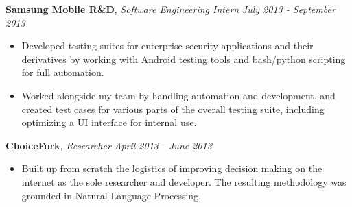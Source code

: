 \documentclass[9pt]{article}
\newenvironment{changemargin}[2]{%
  \begin{list}{}{%
    \setlength{\topsep}{0pt}%
    \setlength{\leftmargin}{#1}%
    \setlength{\rightmargin}{#2}%
    \setlength{\listparindent}{\parindent}%
    \setlength{\itemindent}{\parindent}%
    \setlength{\parsep}{\parskip}%
  }%
  \item[]}{\end{list}
}
\newenvironment{body} {
	\vspace*{-16pt}
	\begin{changemargin}{-0.25in}{-0.5in}
  }	
	{\end{changemargin}
}
\begin{document}
\begin{body}
\begin{itemize}
	\end{itemize}
	\vspace*{-2pt}
	\textbf{Samsung Mobile R\&D}, \emph{Software Engineering Intern} \hfill \emph{July 2013 - September 2013}\\
	\vspace*{-3pt}
	\begin{itemize} \itemsep -0pt %
	\item Developed testing suites for enterprise security applications and their derivatives by working with Android testing tools and bash/python scripting for full automation.
	\item Worked alongside my team by handling automation and development, and created test cases for various parts of the overall testing suite, including optimizing a UI interface for internal use.
	\end{itemize}
	\vspace*{-2pt}
	\vspace*{-1pt}
	\textbf{ChoiceFork}, \emph{Researcher} \hfill \emph{April 2013 - June 2013}\\
	\vspace*{-3pt}
	\begin{itemize} \itemsep -0pt  %
		\item Built up from scratch the logistics of improving decision making on the internet as the sole researcher and developer. The resulting methodology was grounded in Natural Language Processing.

\end{itemize}
\end{body}
\end{document}
